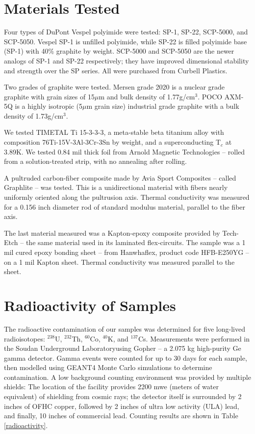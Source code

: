 \documentclass[final]{svjour2}
\begin{document}
\section{Materials Tested}
Four types of DuPont Vespel polyimide were tested: SP-1, SP-22, SCP-5000, and SCP-5050.  Vespel SP-1 is unfilled polyimide, while SP-22 is filled polyimide base (SP-1) with 40\% graphite by weight. SCP-5000 and SCP-5050 are the newer analogs of SP-1 and SP-22 respectively; they have improved dimensional stability and strength over the SP series. All were purchased from Curbell Plastics.

Two grades of graphite were tested. Mersen grade 2020 is a nuclear grade graphite with grain sizes of 15$\mu$m and bulk density of 1.77g/cm$^3$. POCO AXM-5Q is a highly isotropic (5$\mu$m grain size) industrial grade graphite with a bulk density of 1.73g/cm$^3$.

We tested TIMETAL Ti 15-3-3-3, a meta-stable beta titanium alloy with composition 76Ti-15V-3Al-3Cr-3Sn by weight, and a superconducting T$_c$ at 3.89K. We tested 0.84 mil thick foil from Arnold Magnetic Technologies -- rolled from a solution-treated strip, with no annealing after rolling.

A pultruded carbon-fiber composite made by Avia Sport Composites -- called Graphlite -- was tested. This is a unidirectional material with fibers nearly uniformly oriented along the pultrusion axis. Thermal conductivity was measured for a 0.156 inch diameter rod of standard modulus material, parallel to the fiber axis.

The last material measured was a Kapton-epoxy composite provided by Tech-Etch -- the same material used in its laminated flex-circuits. The sample was a 1 mil cured epoxy bonding sheet -- from Hanwhaflex, product code HFB-E250YG -- on a 1 mil Kapton sheet.  Thermal conductivity was measured parallel to the sheet.

\section{Radioactivity of Samples}
The radioactive contamination of our samples was determined for five long-lived radioisotopes: $^{238}$U, $^{232}$Th, $^{60}$Co, $^{40}$K, and $^{137}$Cs. Measurements were performed in the Soudan Underground Laboratory\footnotemark using Gopher -- a 2.075 kg high-purity Ge gamma detector. Gamma events were counted for up to 30 days for each sample, then modelled using GEANT4 Monte Carlo simulations to determine contamination. A low background counting environment was provided by multiple shields: The location of the facility provides 2200 mwe (meters of water equivalent) of shielding from cosmic rays; the detector itself is surrounded by 2 inches of OFHC copper, followed by 2 inches of ultra low activity (ULA) lead, and finally, 10 inches of commercial lead. Counting results are shown in Table \ref{radioactivity}.
\end{document}
